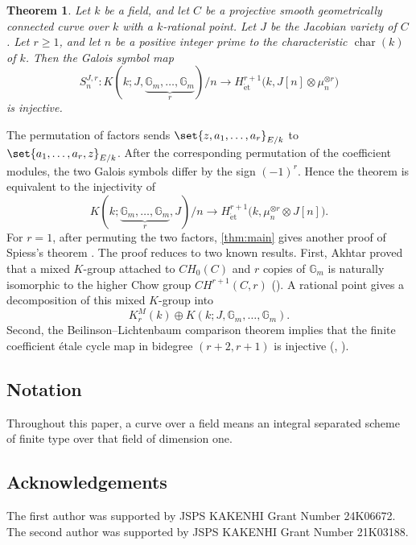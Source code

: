 \documentclass[a4paper,12pt]{amsart}
\numberwithin{equation}{section}
\newtheorem{thm}{Theorem}[section]
\theoremstyle{definition}
\newcommand{\Char}{\operatorname{char}}
\newcommand{\Gm}{\mathbb{G}_{m}}
\newcommand{\Het}{H_{\mathrm{\acute et}}}
\begin{document}
\begin{thm}\label{thm:main}
Let $k$ be a field, and let $C$ be a projective smooth geometrically connected curve over $k$ with a $k$-rational point.  Let $J$ be the
Jacobian variety of $C$.  Let $r\geq 1$, and let $n$ be a positive
integer prime to the characteristic $\Char(k)$ of $k$.  Then the Galois symbol map
\begin{equation}\label{eq:main}
 S_n^{J,r}\colon
 K(k;J,\underbrace{\Gm,\ldots,\Gm}_{r})/n
 \to
 \Het^{r+1}\bigl(k,J[n]\otimes\mu_n^{\otimes r}\bigr)
\end{equation}
is injective.
\end{thm}

The permutation of factors sends
$\set{z,a_1,\ldots,a_r}_{E/k}$ to
$\set{a_1,\ldots,a_r,z}_{E/k}$.  After the corresponding permutation
of the coefficient modules, the two Galois symbols differ by the sign
$(-1)^r$.  Hence the theorem is equivalent to the injectivity of
\[
 K(k;\underbrace{\Gm,\ldots,\Gm}_{r},J)/n
 \to 
 \Het^{r+1}\bigl(k,\mu_n^{\otimes r}\otimes J[n]\bigr).
\]
For $r=1$, after permuting the two factors,
\autoref{thm:main} gives another proof of Spiess's theorem \cite[Appendix, Theorem 6.1]{Yam05}.  
The proof reduces to two known results.  First, Akhtar proved that
a mixed $K$-group attached to $CH_0(C)$ and $r$ copies of
$\Gm$ is naturally isomorphic to the higher Chow group $CH^{r+1}(C,r)$ 
(\cite[Theorem~6.1]{Akh04}).  A rational point gives a decomposition of
this mixed $K$-group into
\[
 K_r^M(k)\oplus K(k;J,\Gm,\ldots,\Gm).
\]
Second, the Beilinson--Lichtenbaum comparison theorem implies that the
finite coefficient \'etale cycle map in bidegree $(r+2,r+1)$ is
injective (\cite[Corollary~1.2]{GL01}, \cite[Theorem~6.17]{Voe11}). 

\subsection*{Notation} 
Throughout this paper, a curve over a field means an integral
separated scheme of finite type over that field of dimension one.

\subsection*{Acknowledgements} 
The first author was supported by JSPS KAKENHI Grant Number 24K06672.
The second author was supported by JSPS KAKENHI Grant Number 21K03188.
\end{document}
